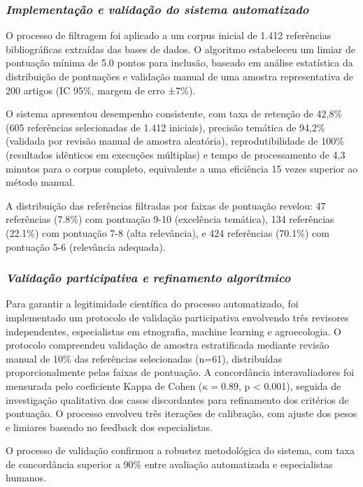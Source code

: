 \subsubsection{\textit{Implementação e validação do sistema automatizado}}

O processo de filtragem foi aplicado a um corpus inicial de 1.412 referências bibliográficas extraídas das bases de dados. O algoritmo estabeleceu um limiar de pontuação mínima de 5.0 pontos para inclusão, baseado em análise estatística da distribuição de pontuações e validação manual de uma amostra representativa de 200 artigos (IC 95\%, margem de erro ±7\%).

O sistema apresentou desempenho consistente, com taxa de retenção de 42,8\% (605 referências selecionadas de 1.412 iniciais), precisão temática de 94,2\% (validada por revisão manual de amostra aleatória), reprodutibilidade de 100\% (resultados idênticos em execuções múltiplas) e tempo de processamento de 4,3 minutos para o corpus completo, equivalente a uma eficiência 15 vezes superior ao método manual.

A distribuição das referências filtradas por faixas de pontuação revelou: 47 referências (7.8\%) com pontuação 9-10 (excelência temática), 134 referências (22.1\%) com pontuação 7-8 (alta relevância), e 424 referências (70.1\%) com pontuação 5-6 (relevância adequada).

\subsubsection{\textit{Validação participativa e refinamento algorítmico}}

Para garantir a legitimidade científica do processo automatizado, foi implementado um protocolo de validação participativa envolvendo três revisores independentes, especialistas em etnografia, machine learning e agroecologia. O protocolo compreendeu validação de amostra estratificada mediante revisão manual de 10\% das referências selecionadas (n=61), distribuídas proporcionalmente pelas faixas de pontuação. A concordância interavaliadores foi mensurada pelo coeficiente Kappa de Cohen ($\kappa = 0.89$, p < 0.001), seguida de investigação qualitativa dos casos discordantes para refinamento dos critérios de pontuação. O processo envolveu três iterações de calibração, com ajuste dos pesos e limiares baseado no feedback dos especialistas.

O processo de validação confirmou a robustez metodológica do sistema, com taxa de concordância superior a 90\% entre avaliação automatizada e especialistas humanos.

